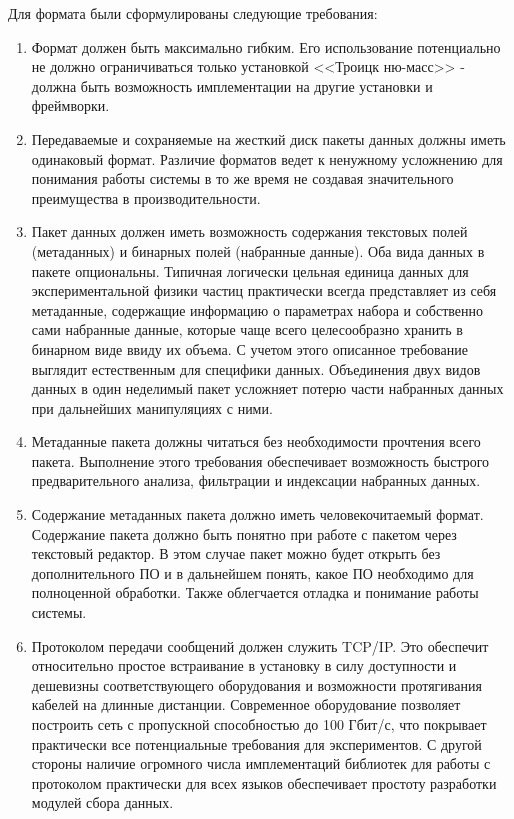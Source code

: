 \documentclass[a4paper,14pt]{extreport}
\begin{document}
Для формата были сформулированы следующие требования:
\begin{enumerate}
    \item Формат должен быть максимально гибким. Его использование потенциально не должно ограничиваться только установкой <<Троицк ню-масс>> - должна быть возможность имплементации на другие установки и фреймворки.
    \item Передаваемые и сохраняемые на жесткий диск пакеты данных должны иметь одинаковый формат. Различие форматов ведет к ненужному усложнению для понимания работы системы в то же время не создавая значительного преимущества в производительности.
    \item Пакет данных должен иметь возможность содержания текстовых полей (метаданных) и бинарных полей (набранные данные). Оба вида данных в пакете опциональны. Типичная логически цельная единица данных для экспериментальной физики частиц практически всегда представляет из себя метаданные, содержащие информацию о параметрах набора и собственно сами набранные данные, которые чаще всего целесообразно хранить в бинарном виде ввиду их объема. С учетом этого описанное требование выглядит естественным для специфики данных. Объединения двух видов данных в один неделимый пакет усложняет потерю части набранных данных при дальнейших манипуляциях с ними.
    \item Метаданные пакета должны читаться без необходимости прочтения всего пакета. Выполнение этого требования обеспечивает возможность быстрого предварительного анализа, фильтрации и индексации набранных данных.
    \item Содержание метаданных пакета должно иметь человекочитаемый формат. Содержание пакета должно быть понятно при работе с пакетом через текстовый редактор. В этом случае пакет можно будет открыть без дополнительного ПО и в дальнейшем понять, какое ПО необходимо для полноценной обработки. Также облегчается отладка и понимание работы системы.
    \item Протоколом передачи сообщений должен служить TCP/IP. Это обеспечит относительно простое встраивание в установку в силу доступности и дешевизны соответствующего оборудования и возможности протягивания кабелей на длинные дистанции. Современное оборудование позволяет построить сеть с пропускной способностью до 100 Гбит/с, что покрывает практически все потенциальные требования для экспериментов. С другой стороны наличие огромного числа имплементаций библиотек для работы с протоколом практически для всех языков обеспечивает простоту разработки модулей сбора данных.

\end{enumerate}
\end{document}
